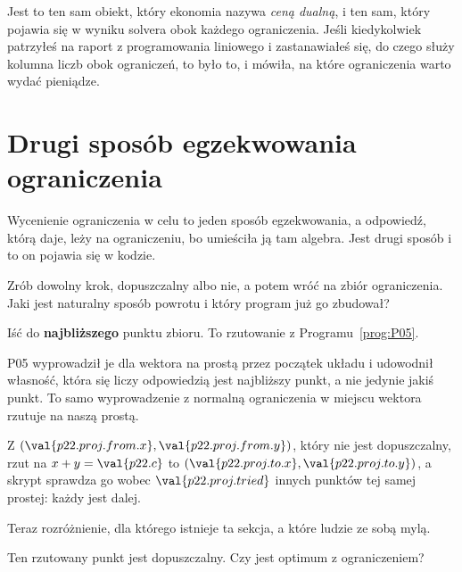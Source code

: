 \begin{fr}
\begin{note}
Jest to ten sam obiekt, który ekonomia nazywa \emph{ceną dualną}, i ten sam,
który pojawia się w wyniku solvera obok każdego ograniczenia. Jeśli kiedykolwiek
patrzyłeś na raport z programowania liniowego i zastanawiałeś się, do czego
służy kolumna liczb obok ograniczeń, to było to, i mówiła, na które ograniczenia
warto wydać pieniądze.
\end{note}
\end{fr}

\section{Drugi sposób egzekwowania ograniczenia}
\label{sec:P22-projection}

\begin{fr}
Wycenienie ograniczenia w celu to jeden sposób egzekwowania, a odpowiedź, którą
daje, leży na ograniczeniu, bo umieściła ją tam algebra. Jest drugi sposób i to
on pojawia się w kodzie.

Zrób dowolny krok, dopuszczalny albo nie, a potem wróć na zbiór ograniczenia.
Jaki jest naturalny sposób powrotu i który program już go zbudował?
\dotline
\nextframe
\end{fr}

\begin{fr}
\begin{ansblock}
Iść do \textbf{najbliższego} punktu zbioru. To rzutowanie z
Programu~\ref{prog:P05}.
\end{ansblock}

P05 wyprowadził je dla wektora na prostą przez początek układu i udowodnił
własność, która się liczy \dash{} odpowiedzią jest najbliższy punkt, a nie
jedynie jakiś punkt. To samo wyprowadzenie z normalną ograniczenia w miejscu
wektora rzutuje na naszą prostą.

Z $(\val{p22.proj.from.x}, \val{p22.proj.from.y})$, który nie jest dopuszczalny,
rzut na $x + y = \val{p22.c}$ to
$(\val{p22.proj.to.x}, \val{p22.proj.to.y})$, a skrypt sprawdza go wobec
$\val{p22.proj.tried}$ innych punktów tej samej prostej: każdy jest dalej.

\end{fr}

\begin{fr}
Teraz rozróżnienie, dla którego istnieje ta sekcja, a które ludzie ze sobą
mylą.

Ten rzutowany punkt jest dopuszczalny. Czy jest optimum z ograniczeniem?
\nextframe
\end{fr}


